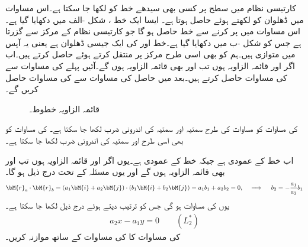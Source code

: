 کارتیسی نظام میں  سطح پر کسی بھی سیدھے خط کو  لکھا جا سکتا ہے۔اس مساوات میں ڈھلوان  کو    لکھتے ہوئے  حاصل ہوتا ہے۔ ایسا ایک خط ، شکل -الف میں دکھایا گیا ہے۔اس مساوات میں  پر کرنے سے خط  حاصل ہو گا جو کارتیسی نظام کے مرکز  سے گزرتا ہے جس کو شکل -ب میں  دکھایا گیا ہے۔خط  اور  کی ایک جیسی ڈھلوان ہے یعنی یہ آپس میں متوازی ہیں۔ہم   کو بھی اسی طرح مرکز پر منتقل کرتے ہوئے  حاصل کرتے ہیں۔اب اگر  اور  قائمہ الزاویہ ہوں تب  اور  بھی قائمہ الزاویہ ہوں گے۔آئیں پہلے  کی مساوات سے  کی مساوات حاصل کرتے ہیں۔بعد میں حاصل  کی مساوات سے  کی مساوات حاصل کریں گے۔ 
\begin{figure}
\centering
{}
\caption{قائمہ الزاویہ خطوط۔}
\label{شکل_الجبرا_قائمہ_الزاویہ_خطوط}
\end{figure}

 کی مساوات   کو مساوات  کی طرح سمتیہ  اور سمتیہ  کی اندرونی ضرب   لکھا جا سکتا ہے۔ کی مساوات کو بھی اسی طرح  اور سمتیہ  کی اندرونی ضرب
   لکھا جا سکتا ہے۔

اب  خط  کے عمودی ہے جبکہ  خط  کے عمودی ہے۔یوں اگر  اور  قائمہ الزاویہ ہوں تب  اور  بھی قائمہ الزاویہ ہوں گے اور یوں مسئلہ   کے تحت درج ذیل ہو گا۔
\begin{align*}
\bM{r}_a\cdot \bM{r}_b=(a_1\bM{i}+a_2\bM{j})\cdot(b_1\bM{i}+b_2\bM{j})=a_1b_1+a_2b_2=0,\quad \implies \quad b_2=-\frac{a_1}{a_2}b_1
\end{align*}
یوں  کی مساوات  ہو گی جس کو ترتیب دیتے ہوئے درج ذیل لکھا جا سکتا ہے۔
\begin{align}
a_2x-a_1y=0\quad \quad (L_2^*)
\end{align}
  کی مساوات کا  کی مساوات  کے ساتھ موازنہ کریں۔

